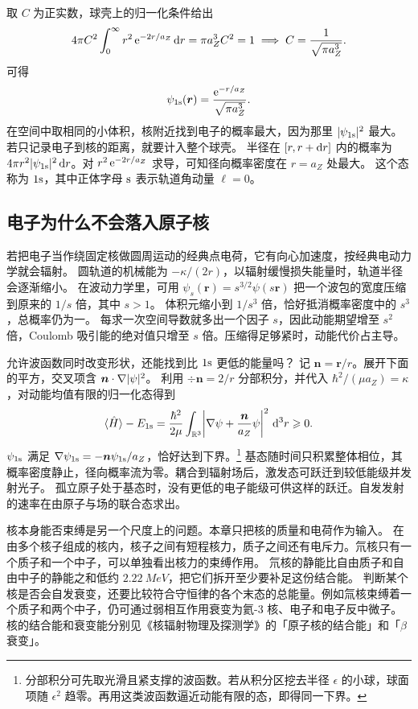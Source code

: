 取 $C$ 为正实数，球壳上的归一化条件给出
\[
    4\pi C^2\int_0^\infty r^2\mathop{}\!\mathrm{e}^{-2r/a_Z}\mathop{}\!\mathrm{d} r = \pi a_Z^3 C^2 = 1 \implies C = \frac1{\sqrt{\pi a_Z^3}}.
\]
可得
\begin{equation}
    \psi_{1\mathrm{s}}(\bm r) = \frac{\mathop{}\!\mathrm{e}^{-r/a_Z}}{\sqrt{\pi a_Z^3}}.
\end{equation}
在空间中取相同的小体积，核附近找到电子的概率最大，因为那里 $\lvert\psi_{1\mathrm{s}}\rvert^2$ 最大。若只记录电子到核的距离，就要计入整个球壳。
半径在 $[r,r + \mathop{}\!\mathrm{d} r]$ 内的概率为 $4\pi r^2\lvert\psi_{1\mathrm{s}}\rvert^2\mathop{}\!\mathrm{d} r$。对 $r^2\mathop{}\!\mathrm{e}^{-2r/a_Z}$ 求导，可知径向概率密度在 $r = a_Z$ 处最大。
这个态称为 $1\mathrm{s}$，其中正体字母 $\mathrm{s}$ 表示轨道角动量 $\ell = 0$。

\subsection{电子为什么不会落入原子核}
\label{ss:qm-atomic-stability}
若把电子当作绕固定核做圆周运动的经典点电荷，它有向心加速度，按经典电动力学就会辐射。
圆轨道的机械能为 $-\kappa/(2r)$，以辐射缓慢损失能量时，轨道半径会逐渐缩小。
在波动力学里，可用 $\psi_s(\bm r) = s^{3/2}\psi(s\bm r)$ 把一个波包的宽度压缩到原来的 $1/s$ 倍，其中 $s > 1$。
体积元缩小到 $1/s^3$ 倍，恰好抵消概率密度中的 $s^3$，总概率仍为一。
每求一次空间导数就多出一个因子 $s$，因此动能期望增至 $s^2$ 倍，Coulomb 吸引能的绝对值只增至 $s$ 倍。压缩得足够紧时，动能代价占主导。

允许波函数同时改变形状，还能找到比 $1\mathrm{s}$ 更低的能量吗？
记 $\bm n = \bm r/r$。展开下面的平方，交叉项含 $\bm n \cdot \nabla\lvert\psi\rvert^2$。
利用 $\div\bm n = 2/r$ 分部积分，并代入 $\hbar^2/(\mu a_Z) = \kappa$，对动能均值有限的归一化态得到
\begin{equation}
    \langle\hat{H}\rangle - E_{1\mathrm{s}}
    = \frac{\hbar^2}{2\mu}\int_{\mathbb{R}^3}
      \biggl\lvert\nabla\psi + \frac{\bm n}{a_Z}\psi\biggr\rvert^2\,\mathop{}\!\mathrm{d}^3 r \geqslant 0 .
    \label{eq:qm-hydrogen-energy-bound}
\end{equation}
$\psi_{1\mathrm{s}}$ 满足 $\nabla\psi_{1\mathrm{s}} = -\bm n\psi_{1\mathrm{s}}/a_Z$，恰好达到下界。\footnote{分部积分可先取光滑且紧支撑的波函数。若从积分区挖去半径 $\epsilon$ 的小球，球面项随 $\epsilon^2$ 趋零。再用这类波函数逼近动能有限的态，即得同一下界。}
基态随时间只积累整体相位，其概率密度静止，径向概率流为零。耦合到辐射场后，激发态可跃迁到较低能级并发射光子。
孤立原子处于基态时，没有更低的电子能级可供这样的跃迁。自发发射的速率在由原子与场的联合态求出。

核本身能否束缚是另一个尺度上的问题。本章只把核的质量和电荷作为输入。
在由多个核子组成的核内，核子之间有短程核力，质子之间还有电斥力。氘核只有一个质子和一个中子，可以单独看出核力的束缚作用。
氘核的静能比自由质子和自由中子的静能之和低约 $\qty{2.22}{MeV}$，把它们拆开至少要补足这份结合能\cite{deuteron-binding}。
判断某个核是否会自发衰变，还要比较符合守恒律的各个末态的总能量。例如氚核束缚着一个质子和两个中子，仍可通过弱相互作用衰变为氦-3 核、电子和电子反中微子。
核的结合能和衰变能分别见《核辐射物理及探测学》的「原子核的结合能」和「$\beta$ 衰变」。


